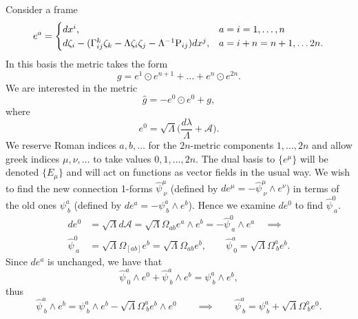 Consider a frame
\begin{equation}
e^{a}=\begin{cases}
 dx^{i}, & a=i=1,\dots,n\\
 d\zeta_{i}-(\Gamma_{ij}^{k}\zeta_{k}-\Lambda \zeta_{i}\zeta_{j}-\Lambda^{-1}\mathrm{P}_{ij}) dx^{j}, & a=i+n=n+1,\dots2n.
\end{cases}\label{eq:basis}
\end{equation}
In this basis the metric takes the form
\begin{equation}
g=e^{1}\odot e^{n+1}+\dots+e^{n}\odot e^{2n}.\label{eq:g_cov_const}
\end{equation}
We are interested in the metric
\[
\hat{g}=-e^{0}\odot e^{0}+g,
\]
where
\[
e^{0}=\sqrt{\Lambda}\biggl(\frac{ d\lambda}{\Lambda}+\mathcal{A}\biggr).
\]
 We reserve Roman indices $a,b,\dots$ for the $2n$-metric components
$1,\dots,2n$ and allow greek indices $\mu,\nu,\dots$ to take values
$0,1,\dots,2n$. The dual basis to $\{e^{\mu}\}$ will be denoted
$\{E_{\mu}\}$ and will act on functions as vector fields in the usual
way. We wish to find the new connection 1-forms $\hat{\psi}_{\ \nu}^{\mu}$
(defined by $ de^{\mu}=-\hat{\psi}_{\ \nu}^{\mu}\wedge e^{\nu}$)
in terms of the old ones $\psi_{\ b}^{a}$ (defined by $ de^{a}=-\psi_{\ b}^{a}\wedge e^{b}$).
Hence we examine ${d}e^{0}$ to find $\hat{\psi}_{\ a}^{0}.$
\begin{align*}
{d}e^{0}&=\sqrt{\Lambda}{d}\mathcal{A}=\sqrt{\Lambda}\Omega_{ab}e^{a}\wedge e^{b}=-\hat{\psi}_{\ a}^{0}\wedge e^{a}\quad\implies \\
\hat{\psi}_{\ a}^{0}&=\sqrt{\Lambda}\Omega_{[ab]}e^{b}=\sqrt{\Lambda}\Omega_{ab}e^{b},\qquad\hat{\psi}_{\ 0}^{a}=\sqrt{\Lambda}\Omega_{\ b}^{a}e^{b}.
\end{align*}
Since ${d}e^{a}$ is unchanged, we have that
\[
\hat{\psi}_{\ 0}^{a}\wedge e^{0}+\hat{\psi}_{\ b}^{a}\wedge e^{b}=\psi_{\ b}^{a}\wedge e^{b},
\]
thus
\[
\hat{\psi}_{\ b}^{a}\wedge e^{b}=\psi_{\ b}^{a}\wedge e^{b}-\sqrt{\Lambda}\Omega_{\ b}^{a}e^{b}\wedge e^{0}\qquad\implies\qquad\hat{\psi}_{\ b}^{a}=\psi_{\ b}^{a}+\sqrt{\Lambda}\Omega_{\ b}^{a}e^{0}.
\]


